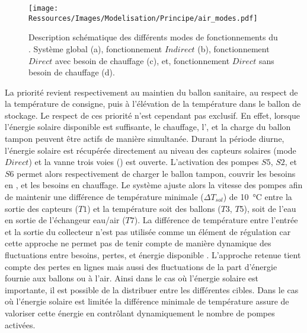 \begin{figure}
    \centering
    \texttt{[image: Ressources/Images/Modelisation/Principe/air\_modes.pdf]}
    \caption[Description schématique des différents modes de fonctionnements du ]
            {Description schématique des différents modes de fonctionnements du . Système
             global (a), fonctionnement $Indirect$ (b), fonctionnement $Direct$ avec besoin de
             chauffage (c), et, fonctionnement $Direct$ sans besoin de chauffage (d).}
    \label{fig:schema_modes}
\end{figure}

La priorité revient respectivement au maintien du ballon sanitaire, au respect de la température de
consigne, puis à l’élévation de la température dans le ballon de stockage. Le respect de
ces priorité n’est cependant pas exclusif. En effet, lorsque l’énergie solaire disponible est
suffisante, le chauffage, l’, et la charge du ballon tampon peuvent être actifs de
manière simultanée.
Durant la période diurne, l’énergie solaire est récupérée directement au niveau des
capteurs solaires (mode $Direct$) et la vanne trois voies () est ouverte.
L’activation des pompes $S5$, $S2$, et $S6$ permet alors respectivement de charger le
ballon tampon, couvrir les besoins en , et les besoins en chauffage. Le système
ajuste alors la vitesse des pompes afin de maintenir une différence de température minimale
($\Delta T_{sol}$) de \SI{10}{\celsius} entre la sortie des capteurs ($T1$) et la
température soit des ballons ($T3$, $T5$), soit de l’eau en sortie de l’échangeur eau/air ($T7$).
La différence de
température entre l’entrée et la sortie du collecteur n’est pas utilisée comme un élément
de régulation car cette approche ne permet pas de tenir compte de manière dynamique
des fluctuations entre besoins, pertes, et énergie disponible \parencite{Mosallat2013686}.
L’approche retenue tient compte des pertes en lignes mais aussi des
fluctuations de la part d’énergie fournie aux ballons ou à l’air. Ainsi dans le cas où
l’énergie solaire est importante, il est possible de la distribuer entre les différentes
cibles. Dans le cas où l’énergie solaire est limitée la différence minimale de température
assure de valoriser cette énergie en contrôlant dynamiquement le nombre de pompes activées.

